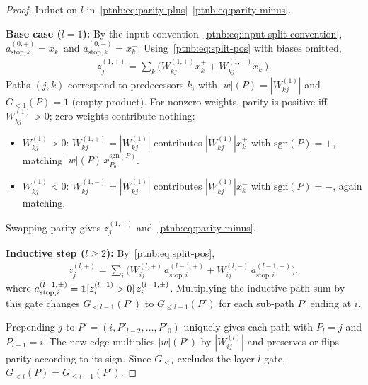 \begin{proof}
Induct on $l$ in~\eqref{ptnb:eq:parity-plus}--\eqref{ptnb:eq:parity-minus}.

\textbf{Base case ($l=1$):} By the input convention~\eqref{ptnb:eq:input-split-convention},
$a_{\mathrm{stop},k}^{(0,+)} = x_k^+$ and $a_{\mathrm{stop},k}^{(0,-)} = x_k^-$.
Using~\eqref{ptnb:eq:split-pos} with biases omitted,
\begin{align}
    z_j^{(1,+)}
    = \sum_k \bigl( W_{kj}^{(1,+)} x_k^+ + W_{kj}^{(1,-)} x_k^- \bigr).
\end{align}
Paths $(j,k)$ correspond to predecessors $k$, with $|w|(P) = |W^{(1)}_{kj}|$ and $G_{<1}(P) = 1$
(empty product). For nonzero weights, parity is positive iff $W^{(1)}_{kj}>0$; zero weights contribute nothing:

\begin{itemize}
    \item $W^{(1)}_{kj} > 0$: $W_{kj}^{(1,+)} = |W^{(1)}_{kj}|$ contributes $|W^{(1)}_{kj}| x_k^+$ with
        $\mathrm{sgn}(P) = +$, matching $|w|(P)\, x_{P_0}^{\mathrm{sgn}(P)}$.
    \item $W^{(1)}_{kj} < 0$: $W_{kj}^{(1,-)} = |W^{(1)}_{kj}|$ contributes $|W^{(1)}_{kj}| x_k^-$ with
        $\mathrm{sgn}(P) = -$, again matching.
\end{itemize}
Swapping parity gives $z_j^{(1,-)}$ and~\eqref{ptnb:eq:parity-minus}.

\textbf{Inductive step ($l \ge 2$):} By~\eqref{ptnb:eq:split-pos},
\begin{align}
    z_j^{(l,+)}
    =
    \sum_i \bigl(
    W_{ij}^{(l,+)}\, a_{\mathrm{stop},i}^{(l-1,+)}
    + W_{ij}^{(l,-)}\, a_{\mathrm{stop},i}^{(l-1,-)}
    \bigr),
\end{align}
where $a_{\mathrm{stop},i}^{(l-1,\pm)} = \mathbf{1}[z_i^{(l-1)} > 0]\, z_i^{(l-1,\pm)}$. Multiplying the
inductive path sum by this gate changes $G_{<l-1}(P')$ to $G_{\le l-1}(P')$ for each sub-path $P'$
ending at $i$.

Prepending $j$ to $P'=(i,P'_{l-2},\dots,P'_0)$ uniquely gives each path with $P_l=j$ and
$P_{l-1}=i$. The new edge multiplies $|w|(P')$ by $|W^{(l)}_{ij}|$ and preserves or flips parity
according to its sign. Since $G_{<l}$ excludes the layer-$l$ gate, $G_{<l}(P)=G_{\le l-1}(P')$.


\end{proof}
